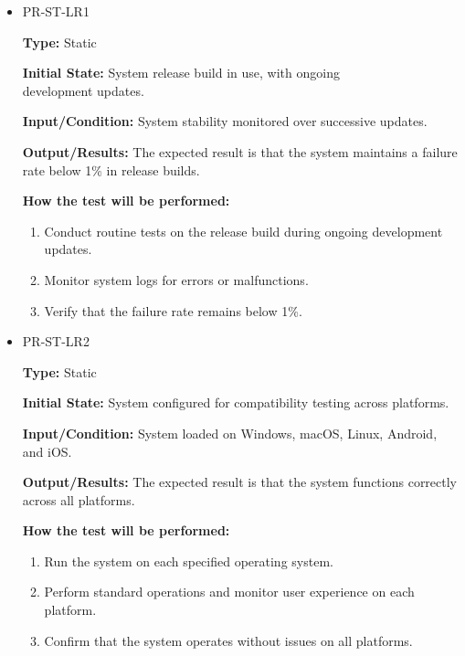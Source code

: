 \documentclass[12pt, titlepage]{article}
\begin{document}
\begin{itemize}
  \item PR-ST-LR1
  \begin{mdframed}[linewidth=0.5mm]
      \textbf{Type:} Static \par
      \textbf{Initial State:} System release build in use, with ongoing \\development updates. \par
      \textbf{Input/Condition:} System stability monitored over successive updates. \par
      \textbf{Output/Results:} The expected result is that the system maintains a failure rate below 1\% in release builds. \par
      \textbf{How the test will be performed:}
      \begin{enumerate}[noitemsep]
        \item Conduct routine tests on the release build during ongoing development updates.
        \item Monitor system logs for errors or malfunctions.
        \item Verify that the failure rate remains below 1\%.
      \end{enumerate}
  \end{mdframed}
  \item PR-ST-LR2
  \begin{mdframed}[linewidth=0.5mm]
      \textbf{Type:} Static \par
      \textbf{Initial State:} System configured for compatibility testing across platforms. \par
      \textbf{Input/Condition:} System loaded on Windows, macOS, Linux, Android, and iOS. \par
      \textbf{Output/Results:} The expected result is that the system functions correctly across all platforms. \par
      \textbf{How the test will be performed:}
      \begin{enumerate}[noitemsep]
        \item Run the system on each specified operating system.
        \item Perform standard operations and monitor user experience on each platform.
        \item Confirm that the system operates without issues on all platforms.
      \end{enumerate}
  \end{mdframed}
\end{itemize}
\end{document}
